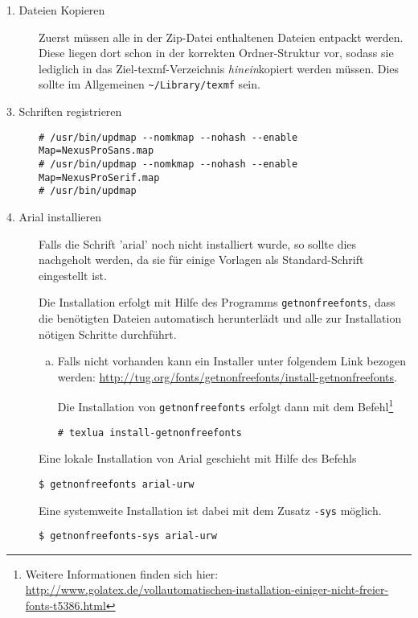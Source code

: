 \begin{description}
  \item[1. Dateien Kopieren] Zuerst müssen alle in der Zip-Datei enthaltenen
    Dateien entpackt werden.
    Diese liegen dort schon in der korrekten Ordner-Struktur vor, sodass
    sie lediglich in das Ziel-texmf-Verzeichnis \emph{hinein}kopiert werden
    müssen.
    Dies sollte im Allgemeinen \lstinline{~/Library/texmf} sein.

  \item[3. Schriften registrieren]\hfill
    \begin{lstlisting}
# /usr/bin/updmap --nomkmap --nohash --enable Map=NexusProSans.map
# /usr/bin/updmap --nomkmap --nohash --enable Map=NexusProSerif.map
# /usr/bin/updmap
    \end{lstlisting}


  \item[4. Arial installieren]\hfill
    Falls die Schrift 'arial' noch nicht installiert wurde, so sollte dies
    nachgeholt werden, da sie für einige Vorlagen als Standard-Schrift
    eingestellt ist.
    
    Die Installation erfolgt mit Hilfe des Programms \lstinline{getnonfreefonts},
    dass die benötigten Dateien automatisch herunterlädt und alle zur Installation
    nötigen Schritte durchführt.
    \begin{enumerate}[a)]
      \item Falls nicht vorhanden kann ein Installer unter folgendem Link
        bezogen werden:
        \url{http://tug.org/fonts/getnonfreefonts/install-getnonfreefonts}.
    
        Die Installation von \lstinline{getnonfreefonts} erfolgt dann mit dem
        Befehl\footnote{Weitere Informationen finden sich hier:\\
          \url{http://www.golatex.de/vollautomatischen-installation-einiger-nicht-freier-fonts-t5386.html}}
        \begin{lstlisting}
# texlua install-getnonfreefonts
        \end{lstlisting}
    \end{enumerate}

    Eine lokale Installation von Arial geschieht mit Hilfe des Befehls
    \begin{lstlisting}
$ getnonfreefonts arial-urw
    \end{lstlisting}
    
    Eine systemweite Installation ist dabei mit dem Zusatz \lstinline{-sys}
    möglich.
    \begin{lstlisting}
$ getnonfreefonts-sys arial-urw
    \end{lstlisting}

\end{description}



